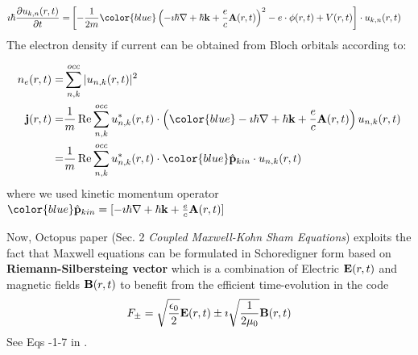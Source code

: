 \documentclass[11pt]{article}
\begin{document}
\begin{align}
    \imath \hbar \pdv{ u_{k,n}(r,t)}{t} 
    =&  \left[ -\frac{1}{2m} {\color{blue}  \left( -\imath \hbar \nabla + \hbar \vb k + \frac{e}{c} \vb A(r,t)\right)}^2   -e \cdot \phi (r,t) + V(r,t) \right] \cdot  u_{k,n}(r,t)
    \label{eq:TD-KS}
\end{align}
The electron density  if current  can be obtained from  Bloch orbitals according to:

\begin{align}
 n_e(r,t) =& \sum_{n,k}^{occ}  |u_{n,k}(r,t)|^2 \\
  \vb j(r,t) =&   \frac{1}{m} \Re \sum_{n,k}^{occ}  u_{n,k}^*(r,t) \cdot  \left( {\color{blue}  -\imath \hbar \nabla + \hbar \vb k + \frac{e}{c} \vb A(r,t) } \right)  u_{n,k}(r,t) \\
  =&  \frac{1}{m} \Re \sum_{n,k}^{occ}  u_{n,k}^*(r,t) \cdot  {\color{blue}  \hat {\vb p}_{kin} } \cdot u_{n,k}(r,t)  \nonumber
\end{align}
where we used kinetic  momentum operator  $ {\color{blue}  \hat {\vb p}_{kin} =  [-\imath \hbar \nabla + \hbar \vb k + \frac{e}{c} \vb A(r,t) ] } $

Now, Octopus  paper \cite{octopus-rt-tddft-JCP-2020} (Sec. 2 \emph{Coupled Maxwell-Kohn Sham Equations}) exploits the fact that Maxwell  equations can be formulated  in Schoredigner form based on {\bf  Riemann-Silbersteing vector } which is a combination of  Electric $\vb E(r,t)$ and magnetic fields $\vb B(r,t)$ to benefit from the efficient time-evolution   in the code
\begin{align*}
    F_ \pm =  \sqrt{\frac{\epsilon_0}{2}}  \vb E(r,t) \pm \imath   \sqrt{\frac{1}{2\mu_0}}  \vb B(r,t) 
\end{align*}
 See Eqs -1-7 in \cite{octopus-rt-tddft-JCP-2020}.
\end{document}
